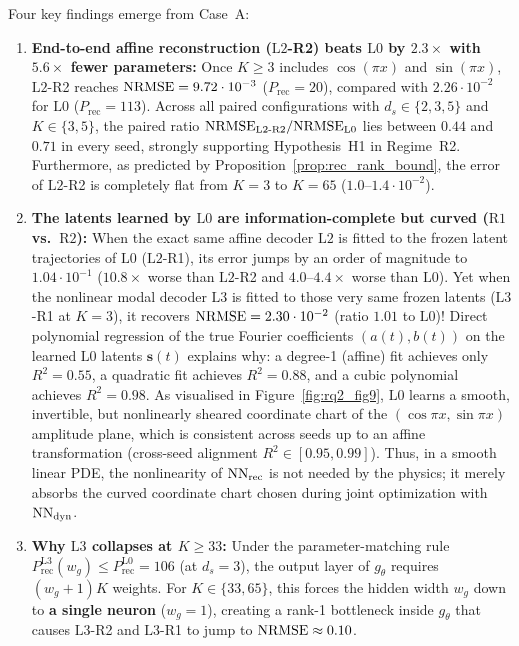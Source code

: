 Four key findings emerge from Case~A:
\begin{enumerate}[leftmargin=2em]
  \item \textbf{End-to-end affine reconstruction ($\mathrm{L2}$-R2) beats $\mathrm{L0}$ by $2.3\times$ with $5.6\times$ fewer parameters:} Once $K \ge 3$ includes $\cos(\pi x)$ and $\sin(\pi x)$, $\mathrm{L2}$-R2 reaches $\mathrm{NRMSE} = 9.72\cdot 10^{-3}$ ($P_{\mathrm{rec}} = 20$), compared with $2.26\cdot 10^{-2}$ for $\mathrm{L0}$ ($P_{\mathrm{rec}} = 113$). Across all paired configurations with $d_s \in \{2,3,5\}$ and $K \in \{3,5\}$, the paired ratio $\mathrm{NRMSE}_{\mathrm{L2\text{-}R2}}/\mathrm{NRMSE}_{\mathrm{L0}}$ lies between $0.44$ and $0.71$ in every seed, strongly supporting Hypothesis~H1 in Regime~R2. Furthermore, as predicted by Proposition~\ref{prop:rec_rank_bound}, the error of $\mathrm{L2}$-R2 is completely flat from $K=3$ to $K=65$ ($1.0$--$1.4\cdot 10^{-2}$).
  \item \textbf{The latents learned by $\mathrm{L0}$ are information-complete but curved ($\mathrm{R1}$ vs.\ $\mathrm{R2}$):} When the exact same affine decoder $\mathrm{L2}$ is fitted to the frozen latent trajectories of $\mathrm{L0}$ ($\mathrm{L2}$-R1), its error jumps by an order of magnitude to $1.04\cdot 10^{-1}$ ($10.8\times$ worse than $\mathrm{L2}$-R2 and $4.0$--$4.4\times$ worse than $\mathrm{L0}$). Yet when the nonlinear modal decoder $\mathrm{L3}$ is fitted to those very same frozen latents ($\mathrm{L3}$-R1 at $K=3$), it recovers $\mathrm{NRMSE} = 2.30\cdot 10^{-2}$ (ratio $1.01$ to $\mathrm{L0}$)! Direct polynomial regression of the true Fourier coefficients $(a(t), b(t))$ on the learned $\mathrm{L0}$ latents $\mathbf{s}(t)$ explains why: a degree-1 (affine) fit achieves only $R^2 = 0.55$, a quadratic fit achieves $R^2 = 0.88$, and a cubic polynomial achieves $R^2 = 0.98$. As visualised in Figure~\ref{fig:rq2_fig9}, $\mathrm{L0}$ learns a smooth, invertible, but nonlinearly sheared coordinate chart of the $(\cos\pi x, \sin\pi x)$ amplitude plane, which is consistent across seeds up to an affine transformation (cross-seed alignment $R^2 \in [0.95, 0.99]$). Thus, in a smooth linear PDE, the nonlinearity of $\mathrm{NN}_{\mathrm{rec}}$ is not needed by the physics; it merely absorbs the curved coordinate chart chosen during joint optimization with $\mathrm{NN}_{\mathrm{dyn}}$.
  \item \textbf{Why $\mathrm{L3}$ collapses at $K \ge 33$:} Under the parameter-matching rule $P_{\mathrm{rec}}^{\mathrm{L3}}(w_g) \le P_{\mathrm{rec}}^{\mathrm{L0}} = 106$ (at $d_s=3$), the output layer of $g_\theta$ requires $(w_g + 1)K$ weights. For $K \in \{33, 65\}$, this forces the hidden width $w_g$ down to \textbf{a single neuron} ($w_g = 1$), creating a rank-1 bottleneck inside $g_\theta$ that causes $\mathrm{L3}$-R2 and $\mathrm{L3}$-R1 to jump to $\mathrm{NRMSE} \approx 0.10$.
\end{enumerate}

